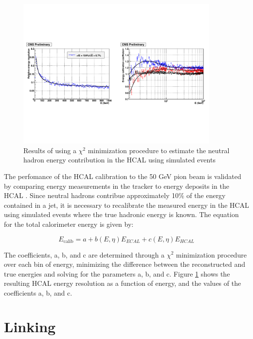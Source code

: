 \begin{figure}[h]
   \centering
  \includegraphics[width=0.9\textwidth]{Figures/Reconstruction_Diagrams/HCAL_calibration_chi2_fit_from_ecal.pdf}
  \caption{Results of using a $\chi^{2}$ minimization procedure to
    estimate the neutral hadron energy contribution in the HCAL using
    simulated events} \label{fig:hcal_calibration}
\end{figure}

\par The perfomance of the HCAL calibration to the 50 GeV pion beam is
validated by comparing energy measurements in the tracker to energy
deposits in the HCAL \cite{CMS-DP-2010-025}.  Since neutral hadrons
contribue approximately 10$\%$ of the energy contained in a jet, it is
necessary to recalibrate the measured energy in the HCAL using
simulated events where the true hadronic energy is known.  The
equation for the total calorimeter energy is given by:

\begin{equation}\label{eq:calorimeter_calibration}
E_{\text{calib}} = a + b(E, \eta)E_{ECAL} + c(E, \eta)E_{HCAL}
\end{equation} 

\noindent The coefficients, a, b, and c are determined through a
$\chi^{2}$ minimization procedure over each bin of energy, minimizing
the difference between the reconstructed and true energies and solving
for the parameters a, b, and c.  Figure \ref{fig:hcal_calibration}
shows the resulting HCAL energy resolution as a function of energy,
and the values of the coefficients a, b, and c.  


\section{Linking}
\label{linking_overview}

